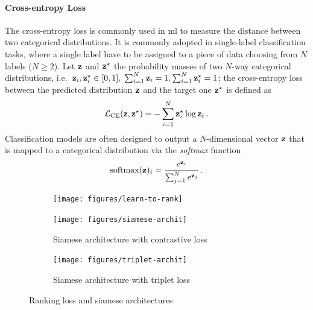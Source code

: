 \paragraph{Cross-entropy Loss}
The cross-entropy loss is commonly used in \gls{ml} to measure the distance between two categorical distributions.
It is commonly adopted in single-label classification tasks, where a single label have to be assigned to a piece of data choosing from $N$ labels ($N \geq 2$).
Let $\mathbf{z}$ and $\mathbf{z}^\star$ the probability masses of two $N$-way categorical distributions, i.e.\ $\mathbf{z}_i, \mathbf{z}^\star_i \in [0,1],\; \sum_{i=1}^N \mathbf{z}_i = 1, \sum_{i=1}^N \mathbf{z}^\star_i = 1$;
the cross-entropy loss between the predicted distribution $\mathbf{z}$ and the target one $\mathbf{z}^\star$ is defined as
%
\begin{equation} \label{eq:back:cross-entropy}
    \mathcal{L}_\textrm{CE}(\mathbf{z}, \mathbf{z}^\star) = - \sum_{i=1}^N \mathbf{z}^\star_i \log \mathbf{z}_i \,.
\end{equation}
%
Classification models are often designed to output a $N$-dimensional vector $\mathbf{z}$ that is mapped to a categorical distribution via the \emph{softmax} function
%
\begin{equation} \label{eq:back:softmax}
    \textrm{softmax}(\mathbf{z})_i = \frac{e^{\mathbf{z}_i}}{\sum_{j=1}^N e^{\mathbf{z}_j}} \,.
\end{equation}
\begin{figure}
    \begin{subfigure}{.3\linewidth}
        \texttt{[image: figures/learn-to-rank]}
        \caption{} %
        \label{fig:back:ranking-loss}
    \end{subfigure}
    \hfill
    \begin{subfigure}{.3\linewidth}
        \texttt{[image: figures/siamese-archit]}
        \caption{Siamese architecture with contrastive loss}
        \label{fig:back:siamese}
    \end{subfigure}
    \hfill
    \begin{subfigure}{.3\linewidth}
        \texttt{[image: figures/triplet-archit]}
        \caption{Siamese architecture with triplet loss}
        \label{fig:back:triplet}
    \end{subfigure}
    \caption{Ranking loss and siamese architectures}
    \label{fig:back:learn-to-rank}
\end{figure}

